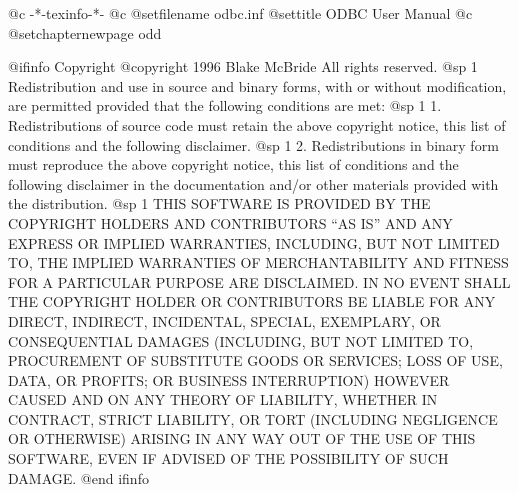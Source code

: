     @c -*-texinfo-*-
@c %
@setfilename odbc.inf
@settitle ODBC User Manual
@c %
@setchapternewpage odd

@ifinfo
Copyright  @copyright{} 1996 Blake McBride
All rights reserved.
@sp 1
Redistribution and use in source and binary forms, with or without
modification, are permitted provided that the following conditions are
met:
@sp 1
1. Redistributions of source code must retain the above copyright
notice, this list of conditions and the following disclaimer.
@sp 1
2. Redistributions in binary form must reproduce the above copyright
notice, this list of conditions and the following disclaimer in the
documentation and/or other materials provided with the distribution.
@sp 1
THIS SOFTWARE IS PROVIDED BY THE COPYRIGHT HOLDERS AND CONTRIBUTORS
``AS IS'' AND ANY EXPRESS OR IMPLIED WARRANTIES, INCLUDING, BUT NOT
LIMITED TO, THE IMPLIED WARRANTIES OF MERCHANTABILITY AND FITNESS FOR
A PARTICULAR PURPOSE ARE DISCLAIMED. IN NO EVENT SHALL THE COPYRIGHT
HOLDER OR CONTRIBUTORS BE LIABLE FOR ANY DIRECT, INDIRECT, INCIDENTAL,
SPECIAL, EXEMPLARY, OR CONSEQUENTIAL DAMAGES (INCLUDING, BUT NOT
LIMITED TO, PROCUREMENT OF SUBSTITUTE GOODS OR SERVICES; LOSS OF USE,
DATA, OR PROFITS; OR BUSINESS INTERRUPTION) HOWEVER CAUSED AND ON ANY
THEORY OF LIABILITY, WHETHER IN CONTRACT, STRICT LIABILITY, OR TORT
(INCLUDING NEGLIGENCE OR OTHERWISE) ARISING IN ANY WAY OUT OF THE USE
OF THIS SOFTWARE, EVEN IF ADVISED OF THE POSSIBILITY OF SUCH DAMAGE.
@end ifinfo

